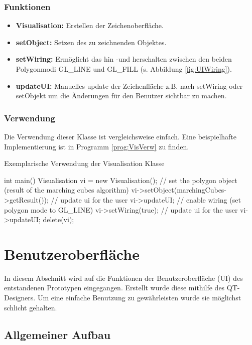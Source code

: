 \subsubsection{Funktionen}
\begin{itemize}
	\item \textbf{Visualisation:} Erstellen der Zeichenoberfläche.
	\item \textbf{setObject:} Setzen des zu zeichnenden Objektes.
	\item \textbf{setWiring:} Ermöglicht das hin -und herschalten zwischen den beiden Polygonmodi GL\_LINE und GL\_FILL (s. Abbildung \ref{fig:UIWiring}).
	\item \textbf{updateUI:} Manuelles update der Zeichenfläche z.B. nach setWiring oder setObjekt um die Änderungen für den Benutzer sichtbar zu machen.
\end{itemize}
\subsubsection{Verwendung}
Die Verwendung dieser Klasse ist vergleichsweise einfach. Eine beispielhafte Implementierung ist in Programm \ref{prog:VisVerw} zu finden.
\begin{program}
	\caption{Exemplarische Verwendung der Visualisation Klasse}
	\label{prog:VisVerw}
	\begin{CCode}
		int main(){
			Visualisation vi = new Visualisation();
			// set the polygon object (result of the marching cubes algorithm)
			vi->setObject(marchingCubes->getResult());
			// update ui for the user
			vi->updateUI;
			// enable wiring (set polygon mode to GL\_LINE)
			vi->setWiring(true);
			// update ui for the user
			vi->updateUI;
			delete(vi);
		} 
	\end{CCode}
\end{program}

\section{Benutzeroberfläche}
In diesem Abschnitt wird auf die Funktionen der Benutzeroberfläche (UI) des entstandenen Prototypen eingegangen. Erstellt wurde diese mithilfe des QT-Designers. Um eine einfache Benutzung zu gewährleisten wurde sie möglichst schlicht gehalten.

\subsection{Allgemeiner Aufbau}

